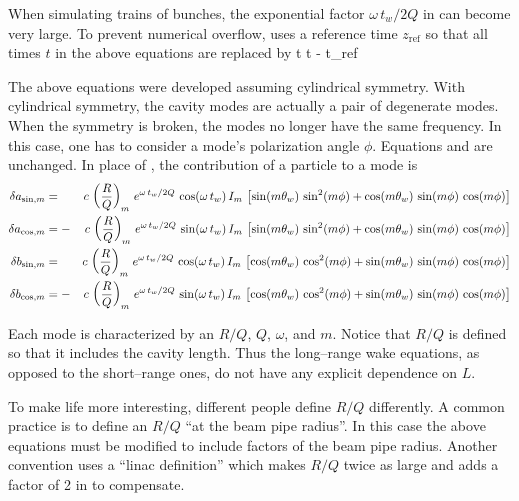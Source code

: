 When simulating trains of bunches, the exponential factor $\omega \, t_w / 2
Q$ in  can become very large. To prevent numerical overflow,
\bmad uses a reference time $z_{\mbox{ref}}$ so that all times
$t$ in the above equations are replaced by
\Begineq
  t \longrightarrow t - t_{\mbox{ref}}
\Endeq

The above equations were developed assuming cylindrical symmetry. With
cylindrical symmetry, the cavity modes are actually a pair of
degenerate modes. When the symmetry is broken, the modes no longer have the
same frequency. In this case, one has to consider a mode's polarization
angle $\phi$. Equations  and  are unchanged. 
In place of , the contribution of a particle to a mode is
\begin{alignat}{2}
  \delta a_{\sin, m} &=  &c \, \left( \frac{R}{Q} \right)_m \,
    e^{\omega \, t_w/ 2 Q} \, \cos (\omega \, t_w) \, I_m \, \left[
    \sin(m \theta_w) \, \sin^2(m \phi) + 
    \cos(m \theta_w) \, \sin(m \phi) \, \cos(m\phi) \right]
    \nonumber \\
  \delta a_{\cos, m} &= -&c \, \left( \frac{R}{Q} \right)_m \,
    e^{\omega \, t_w/ 2 Q} \, \sin (\omega \, t_w) \, I_m \, \left[ 
    \sin(m \theta_w) \, \sin^2(m \phi) + 
    \cos(m \theta_w) \, \sin(m \phi) \, \cos(m\phi) \right]
    \\
  \delta b_{\sin, m} &=  &c \, \left( \frac{R}{Q} \right)_m \,
    e^{\omega \, t_w/ 2 Q} \, \cos (\omega \, t_w) \, I_m \, \left[
    \cos(m \theta_w) \, \cos^2(m \phi) + 
    \sin(m \theta_w) \, \sin(m \phi) \, \cos(m\phi) \right]
    \nonumber \\
  \delta b_{\cos, m} &= -&c \, \left( \frac{R}{Q} \right)_m \,
    e^{\omega \, t_w/ 2 Q} \, \sin (\omega \, t_w) \, I_m \, \left[
    \cos(m \theta_w) \, \cos^2(m \phi) + 
    \sin(m \theta_w) \, \sin(m \phi) \, \cos(m\phi) \right]
    \nonumber
\end{alignat}

Each mode is characterized by an $R/Q$, $Q$, $\omega$, and $m$. Notice
that $R/Q$ is defined so that it includes the cavity length. Thus the
long--range wake equations, as opposed to the short--range ones, do
not have any explicit dependence on $L$. 

To make life more interesting, different people define $R/Q$
differently. A common practice is to define an $R/Q$ ``at the beam
pipe radius''. In this case the above equations must be modified to
include factors of the beam pipe radius. Another convention uses a
``linac definition'' which makes $R/Q$ twice as large and adds a
factor of 2 in  to compensate.

